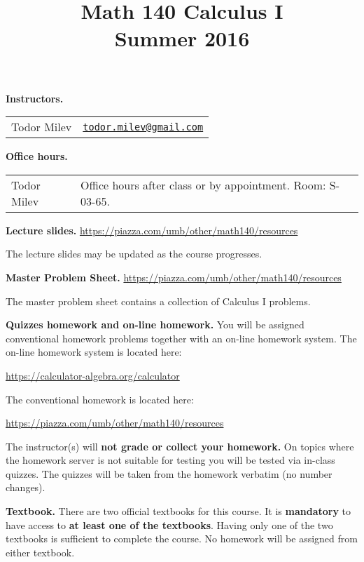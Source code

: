 \documentclass{article}
\title{\vskip -2cm 
 Math 140 Calculus I \\ Summer 2016}
\date{}
\newcommand{\websitebase}{https://piazza.com/umb/other/math140}
\begin{document}
\maketitle


\noindent \textbf{Instructors.} 
\begin{tabular}{ll}
Todor Milev & \href{mailto:todor.milev@gmail.com}{\nolinkurl{todor.milev@gmail.com}} 
\end{tabular}

\medskip
\noindent \textbf{Office hours. } \begin{tabular}{lp{12cm}}
Todor Milev & Office hours after class or by appointment. Room: S-03-65.\\
\end{tabular}

\medskip \noindent \textbf{Lecture slides. }  \url{\websitebase/resources}

\medskip\noindent The lecture slides may be updated as the course progresses.


\medskip \noindent \textbf{Master Problem Sheet. }  \url{\websitebase/resources} 

\medskip\noindent The master problem sheet contains a collection of Calculus I problems. 

\medskip
\noindent \textbf{Quizzes homework and on-line homework.} You will be assigned conventional homework problems together with an on-line homework system. The on-line homework system is located here:

\url{https://calculator-algebra.org/calculator}

\noindent The conventional homework is located here:

\url{\websitebase/resources}

\noindent  The instructor(s) will \textbf{not grade or collect your homework.} On topics where the homework server is not suitable for testing you will be tested via in-class quizzes. The quizzes will be taken from the homework verbatim (no number changes).


\medskip



\medskip\noindent \textbf{Textbook. } There are two official textbooks for this course. It is  \textbf{mandatory} to have access to \textbf{at least one of the textbooks}. Having only one of the two textbooks is sufficient to complete the course. No homework will be assigned from either textbook. 
\end{document}
